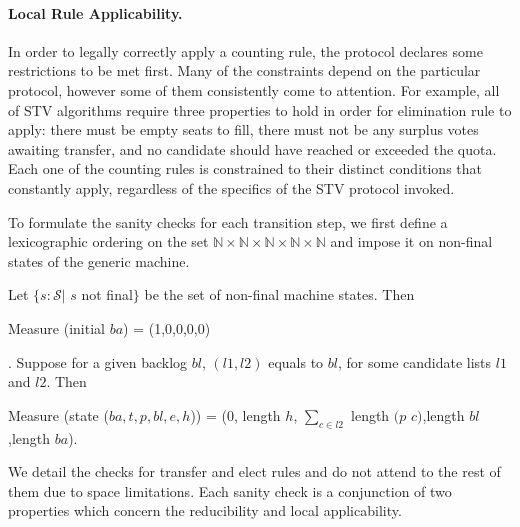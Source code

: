 \documentclass{llncs}
\begin{document}
\paragraph{Local Rule Applicability.} In order to legally correctly apply a counting rule, the protocol declares some restrictions to be met first. Many of the constraints depend on the particular protocol, however some of them consistently come to attention. For example, all of STV algorithms require three properties to hold in order for elimination rule to apply: there must be empty seats to fill, there must not be any surplus votes awaiting transfer, and no candidate should have reached or exceeded the quota. Each one of the counting rules is constrained to their distinct conditions that constantly apply, regardless of the specifics of the STV protocol invoked.


To formulate the sanity checks for each transition step, we first  define a lexicographic ordering on the set $\mathbb{N}\times\mathbb{N}\times\mathbb{N}\times\mathbb{N}
\times\mathbb{N}$ and impose it on non-final states of the generic machine.   
\begin{definition}
Let $\{s: \mathcal{S} |$ $s$ not final$\}$ be the set of non-final machine states. 
Then \begin{small}\textsf{Measure} (\textsf{initial} $ba$) = (1,0,0,0,0)\end{small}. Suppose for a given backlog $bl$, $(l1,l2)$ equals to $bl$, for some candidate lists $l1$ and $l2$. Then   
\begin{small}
\begin{center}
 \textsf{Measure} (\textsf{state} ($ba,t,p,bl,e,h$)) = (0, \textsf{length} $h$, $\sum_{c\in l2}^{}$ \textsf{length} $(p$ $c)$,\textsf{length} $bl$,\textsf{length}  $ba$).
\end{center}
\end{small}
\end{definition}
We detail the checks for transfer and elect rules and do not attend to  the rest of them due to space limitations. Each sanity check is a conjunction of two properties which concern the reducibility and local applicability. 
\end{document}

